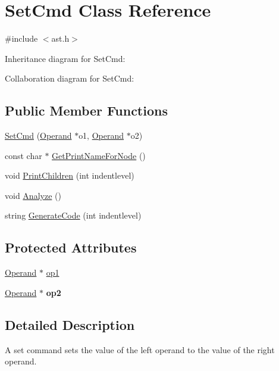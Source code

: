 \hypertarget{class_set_cmd}{}\section{Set\+Cmd Class Reference}
\label{class_set_cmd}


{\ttfamily \#include $<$ast.\+h$>$}



Inheritance diagram for Set\+Cmd\+:


Collaboration diagram for Set\+Cmd\+:
\subsection*{Public Member Functions}
\begin{DoxyCompactItemize}
\item 
\hyperlink{class_set_cmd_ac83b6dcab00a2c796e088ac4c7013cd7}{Set\+Cmd} (\hyperlink{class_operand}{Operand} $\ast$o1, \hyperlink{class_operand}{Operand} $\ast$o2)
\item 
const char $\ast$ \hyperlink{class_set_cmd_a9a9fc62db9b435358ab4addb1dc4cece}{Get\+Print\+Name\+For\+Node} ()
\item 
void \hyperlink{class_set_cmd_ac06d57c11b7c92f3e4b3f94c7a889166}{Print\+Children} (int indentlevel)
\item 
void \hyperlink{class_set_cmd_ad3d2a13f9dd92cddd09c3c280e601583}{Analyze} ()
\item 
string \hyperlink{class_set_cmd_afa73e8c7e0a5115bdcebd4a6cc3ef1d4}{Generate\+Code} (int indentlevel)
\end{DoxyCompactItemize}
\subsection*{Protected Attributes}
\begin{DoxyCompactItemize}
\item 
\hyperlink{class_operand}{Operand} $\ast$ \hyperlink{class_set_cmd_a702a81ef272dd4597f628eee77b09b73}{op1}
\item 
\mbox{\label{class_set_cmd_a1d76cfd7e01387ab771b9e25ea4a73a8}} 
\hyperlink{class_operand}{Operand} $\ast$ {\bfseries op2}
\end{DoxyCompactItemize}


\subsection{Detailed Description}
A set command sets the value of the left operand to the value of the right operand. 

